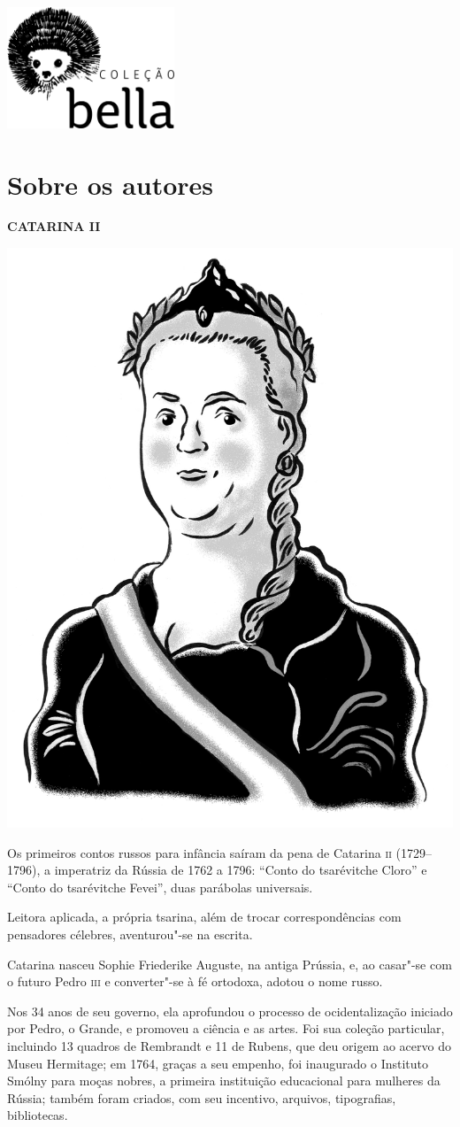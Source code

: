 \blankpage
\thispagestyle{empty}
\vspace*{\fill}
\begin{center}
\includegraphics[width=5cm]{./imgs/bella.jpg}
\end{center}
\vspace*{\fill}

\pagestyle{plain}
\chapter{Sobre os autores}\label{part16}

\begingroup\footnotesize

\textbf{CATARINA II }\medskip

\noindent\includegraphics[width=.8in]{./imgs/autor1.jpg}

\noindent{}Os primeiros contos russos para infância saíram da pena de Catarina \textsc{ii}
(1729--1796), a imperatriz da Rússia de 1762 a 1796: ``Conto do
tsarévitche Cloro'' e ``Conto do tsarévitche Fevei'', duas parábolas universais.

Leitora aplicada, a própria tsarina, além de trocar correspondências com
pensadores célebres, aventurou"-se na escrita.

Catarina nasceu Sophie Friederike Auguste, na antiga Prússia, e, ao
casar"-se com o futuro Pedro \textsc{iii} e converter"-se à fé ortodoxa, adotou o nome
russo.

Nos 34 anos de seu governo, ela aprofundou o processo de ocidentalização
iniciado por Pedro, o Grande, e promoveu a ciência e as artes. Foi sua
coleção particular, incluindo 13 quadros de Rembrandt e 11 de Rubens,
que deu origem ao acervo do Museu Hermitage; em 1764, graças a seu
empenho, foi inaugurado o Instituto Smólny para moças nobres, a primeira
instituição educacional para mulheres da Rússia; também foram criados,
com seu incentivo, arquivos, tipografias, bibliotecas.

